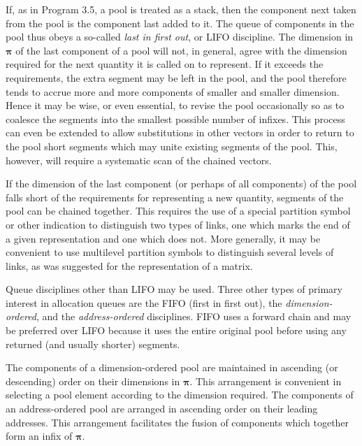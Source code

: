 \par If, as in Program 3.5, a pool is treated as a stack, then the component next taken from the pool is the component last added to it. The queue of components in the pool thus obeys a so-called \textit{last in first out}, or LIFO discipline. The dimension in $\mathbf{π}$ of the last component of a pool will not, in general, agree with the dimension required for the next quantity it is called on to represent. If it exceeds the requirements, the extra segment may be left in the pool, and the pool therefore tends to accrue more and more components of smaller and smaller dimension. Hence it may be wise, or even essential, to revise the pool occasionally so as to coalesce the segments into the smallest possible number of infixes. This process can even be extended to allow substitutions in other vectors in order to return to the pool short segments which may unite existing segments of the pool. This, however, will require a systematic scan of the chained vectors.

\par If the dimension of the last component (or perhaps of all components) of the pool falls short of the requirements for representing a new quantity, segments of the pool can be chained together. This requires the use of a special partition symbol or other indication to distinguish two types of links, one which marks the end of a given representation and one which does not. More generally, it may be convenient to use multilevel partition symbols to distinguish several levels of links, as was suggested for the representation of a matrix.

\par Queue disciplines other than LIFO may be used. Three other types of primary interest in allocation queues are the FIFO (first in first out), the \textit{dimension-ordered}, and the \textit{address-ordered} disciplines. FIFO uses a forward chain and may be preferred over LIFO because it uses the entire original pool before using any returned (and usually shorter) segments.

\par The components of a dimension-ordered pool are maintained in ascending (or descending) order on their dimensions in $\mathbf{π}$. This arrangement is convenient in selecting a pool element according to the dimension required. The components of an address-ordered pool are arranged in ascending order on their leading addresses. This arrangement facilitates the fusion of components which together form an infix of $\mathbf{π}$.

